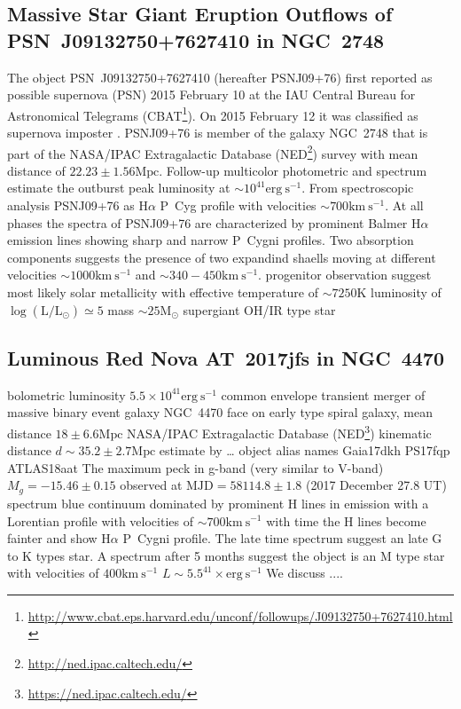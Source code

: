 \documentclass[modern]{aastex63}
\newcommand{\Lsun}{\mathrm{L_\odot}}
\newcommand{\Msun}{\mathrm{M}_\odot}
\newcommand{\kms}{\mathrm{km~s^{-1}}}
\newcommand{\K}{\mathrm{K}}
\newcommand{\ergsec}{\mathrm{erg~s^{-1}}}
\newcommand{\Mpc}{\mathrm{Mpc}}
\newcommand{\mjd}{\mathrm{MJD}}
\newcommand{\Ha}{\mathrm{H}\alpha}
\begin{document}
\subsection{Massive Star Giant Eruption Outflows of PSN~J09132750+7627410 in NGC~2748}
The object PSN~J09132750+7627410 (hereafter PSNJ09+76) first reported as possible supernova (PSN) 2015 February 10 at the IAU Central Bureau for Astronomical Telegrams (CBAT\footnote{\url{http://www.cbat.eps.harvard.edu/unconf/followups/J09132750+7627410.html}}).
On 2015 February 12 it was classified as supernova imposter \citep{2015ATel.7051....1T}.
PSNJ09+76 is member of the galaxy NGC~2748 that is part of the NASA/IPAC Extragalactic Database (NED\footnote{\url{http://ned.ipac.caltech.edu/}}) survey \citep{2017AJ....153...37S} with mean distance of $22.23 \pm 1.56 \Mpc$. 
Follow-up multicolor photometric and spectrum \citep{2016ApJ...823L..23T,2016ApJ...826..191H} estimate the outburst peak luminosity at $\sim 10^{41} \ergsec$.
From spectroscopic analysis PSNJ09+76 as $\Ha$ P~Cyg profile with velocities $\sim 700 \kms$.
At all phases the spectra of PSNJ09+76 are characterized by prominent Balmer $\Ha$ emission lines showing sharp and narrow P~Cygni profiles.
Two absorption components suggests the presence of two expandind shaells moving at different velocities $\sim 1000 \kms$ and $\sim 340-450 \kms$.
progenitor observation suggest most likely solar metallicity with effective temperature of $\sim 7250\K$ luminosity of $\log(\mathrm{L}/\Lsun)\simeq 5$ mass $\sim 25 \Msun$ supergiant OH/IR type star

\subsection{Luminous Red Nova AT~2017jfs in NGC~4470}
bolometric luminosity $5.5\times10^{41}\ergsec$
common envelope transient merger of massive binary event
galaxy NGC~4470 face on early type spiral galaxy, mean distance $18\pm6.6\Mpc$ NASA/IPAC Extragalactic Database (NED\footnote{\url{https://ned.ipac.caltech.edu/}}) kinematic distance $d\sim 35.2\pm 2.7 \Mpc$ estimate by \cite{}\dots
object alias names Gaia17dkh PS17fqp ATLAS18aat
The maximum peck in g-band (very similar to V-band)  $M_g=-15.46 \pm 0.15 $ observed at $\mjd = 58114.8 \pm 1.8 $ (2017 December 27.8 UT) 
spectrum blue continuum dominated by prominent H lines in emission with a Lorentian profile with velocities of $\sim 700 \kms$ 
with time the H lines become fainter and show $\Ha$ P~Cygni profile.
The late time spectrum suggest an late G to K types star.
A spectrum after 5 months suggest the object is an M type star with velocities of $400\kms$
$L\sim 5.5^{41}\times\ergsec$ 
We discuss .... \cite{2019A&A...625L...8P}
\end{document}
